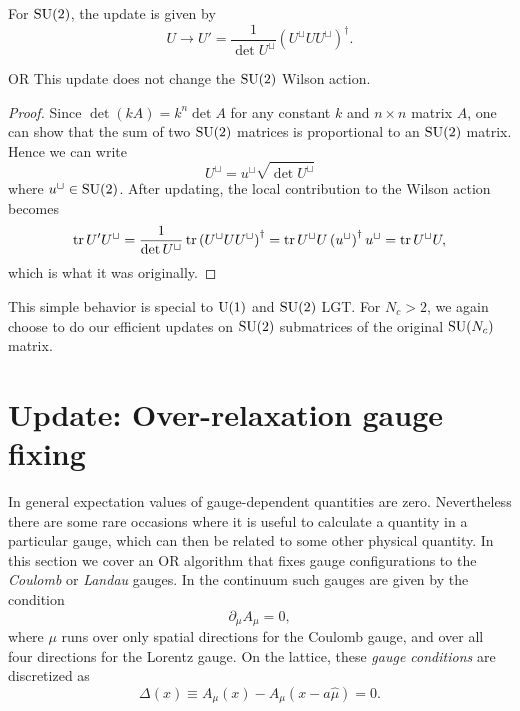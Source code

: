 For $\operatorname{SU}(2)$, the update is given by
\begin{equation}\label{eq:ORupdate}
  U\to U'=\frac{1}{\det U^\sqcup}\left(U^\sqcup UU^\sqcup\right)^\dagger.
\end{equation}
\begin{proposition}{}{OR}\label{prp:OR}
  This update does not change the $\operatorname{SU}(2)$ Wilson action.
  \begin{proof}
   Since $\det(kA)=k^n\det A$ for any constant $k$ and $n\times n$ matrix $A$,
   one can show that the sum of two $\operatorname{SU}(2)$ matrices is proportional
   to an $\operatorname{SU}(2)$ matrix. Hence we can write
    $$
      U^\sqcup=u^\sqcup\sqrt{\det U^\sqcup}
    $$
    where $u^\sqcup\in\operatorname{SU}(2)$. After updating, the local contribution
    to the Wilson action becomes
    \begin{equation*}
      \tr U'U^\sqcup =\frac{1}{\det U^\sqcup}\tr
                       \left(U^\sqcup UU^\sqcup\right)^\dagger
                     =\tr U^\sqcup U\left(u^\sqcup\right)^\dagger u^\sqcup
                     =\tr U^\sqcup U,
    \end{equation*}
    which is what it was originally.
  \end{proof}
\end{proposition}
This simple 
behavior is special to $\operatorname{U}(1)$ and $\operatorname{SU}(2)$ LGT. 
For $N_c>2$, we again choose to do our efficient updates on
$\operatorname{SU}(2)$ submatrices of the original $\operatorname{SU}(N_c)$ matrix. 

\section{Update: Over-relaxation gauge fixing}\label{sec:ORgaugefix}

In general expectation values of gauge-dependent quantities are zero.
Nevertheless there are some rare occasions where it is useful to calculate
a quantity in a particular gauge, which can then be related to some
other physical quantity. In this section we cover an OR
algorithm that fixes gauge configurations to the {\it Coulomb} or 
{\it Landau} gauges.
In the continuum such gauges are given by the condition
\begin{equation}
  \partial_\mu A_\mu=0,
\end{equation}
where $\mu$ runs over only spatial directions for the Coulomb gauge, and
over all four directions for the Lorentz gauge. On the lattice, these 
{\it gauge conditions} are discretized as
\begin{equation}
  \Delta(x)\equiv A_\mu(x)-A_\mu(x-a\hat\mu) =0.
\end{equation}


